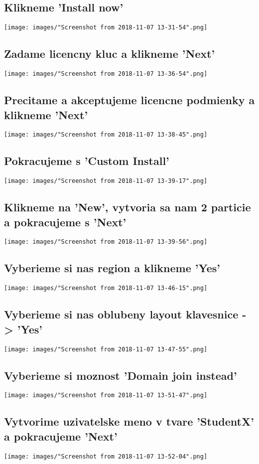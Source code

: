 \documentclass[slovak]{article}
\begin{document}
  \subsection{Klikneme 'Install now'}
  \texttt{[image: images/"Screenshot from 2018-11-07 13-31-54".png]}
  \subsection{Zadame licencny kluc a klikneme 'Next'}
  \texttt{[image: images/"Screenshot from 2018-11-07 13-36-54".png]}
  \subsection{Precitame a akceptujeme licencne podmienky a klikneme 'Next'}
  \texttt{[image: images/"Screenshot from 2018-11-07 13-38-45".png]}
  \subsection{Pokracujeme s 'Custom Install'}
  \texttt{[image: images/"Screenshot from 2018-11-07 13-39-17".png]}
  \subsection{Klikneme na 'New', vytvoria sa nam 2 particie a pokracujeme s 'Next'}
  \texttt{[image: images/"Screenshot from 2018-11-07 13-39-56".png]}
  \subsection{Vyberieme si nas region a klikneme 'Yes'}
  \texttt{[image: images/"Screenshot from 2018-11-07 13-46-15".png]}
  \subsection{Vyberieme si nas oblubeny layout klavesnice -> 'Yes'}
  \texttt{[image: images/"Screenshot from 2018-11-07 13-47-55".png]}
  \subsection{Vyberieme si moznost 'Domain join instead'}
  \texttt{[image: images/"Screenshot from 2018-11-07 13-51-47".png]}
  \subsection{Vytvorime uzivatelske meno v tvare 'StudentX' a pokracujeme 'Next'}
  \texttt{[image: images/"Screenshot from 2018-11-07 13-52-04".png]}
\end{document}
